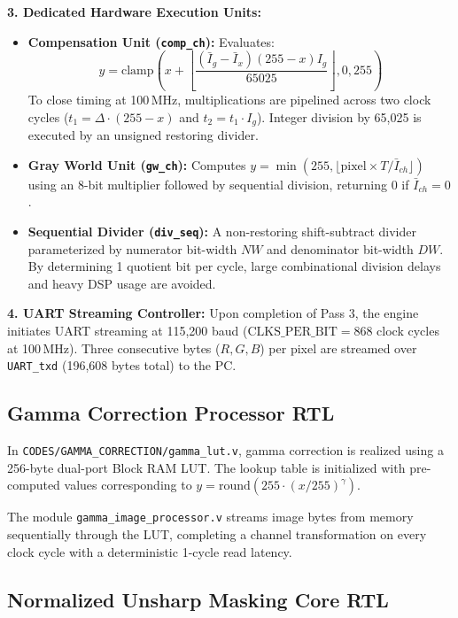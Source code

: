 \documentclass[10pt,twocolumn,letterpaper]{article}
\begin{document}
\textbf{3. Dedicated Hardware Execution Units:}
\begin{itemize}
    \item \textbf{Compensation Unit (\texttt{comp\_ch}):} Evaluates:
    \begin{equation}
      y = \text{clamp}\!\left( x + \left\lfloor\frac{(\bar{I}_g - \bar{I}_x)(255 - x)I_g}{65025}\right\rfloor, 0, 255 \right)
      \label{eq:comp_hw}
    \end{equation}
    To close timing at 100\,MHz, multiplications are pipelined across two clock cycles ($t_1 = \Delta \cdot (255-x)$ and $t_2 = t_1 \cdot I_g$). Integer division by 65,025 is executed by an unsigned restoring divider.
    \item \textbf{Gray World Unit (\texttt{gw\_ch}):} Computes $y = \min(255, \lfloor \text{pixel} \times T / \bar{I}_{ch}\rfloor)$ using an 8-bit multiplier followed by sequential division, returning 0 if $\bar{I}_{ch} = 0$.
    \item \textbf{Sequential Divider (\texttt{div\_seq}):} A non-restoring shift-subtract divider parameterized by numerator bit-width $NW$ and denominator bit-width $DW$. By determining 1 quotient bit per cycle, large combinational division delays and heavy DSP usage are avoided.
\end{itemize}

\textbf{4. UART Streaming Controller:} Upon completion of Pass 3, the engine initiates UART streaming at 115,200 baud ($\text{CLKS\_PER\_BIT} = 868$ clock cycles at 100\,MHz). Three consecutive bytes ($R, G, B$) per pixel are streamed over \texttt{UART\_txd} (196,608 bytes total) to the PC.

\subsection{Gamma Correction Processor RTL}

In \texttt{CODES/GAMMA\_CORRECTION/gamma\_lut.v}, gamma correction is realized using a 256-byte dual-port Block RAM LUT. The lookup table is initialized with pre-computed values corresponding to $y = \text{round}(255 \cdot (x/255)^\gamma)$. 

The module \texttt{gamma\_image\_processor.v} streams image bytes from memory sequentially through the LUT, completing a channel transformation on every clock cycle with a deterministic 1-cycle read latency.

\subsection{Normalized Unsharp Masking Core RTL}
\end{document}
